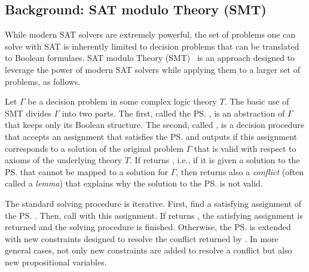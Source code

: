 

\subsection{Background: SAT modulo Theory (SMT)}
\label{sec:background-smt}

While modern SAT solvers are extremely powerful, the set of problems one can solve with SAT is inherently limited to decision problems that can be translated to Boolean formulaes. 
SAT modulo Theory (SMT)~\cite{DBLP:journals/jacm/NieuwenhuisOT06,DBLP:journals/constraints/BofillPSV12,DBLP:conf/cp/Nieuwenhuis10} is an approach designed to leverage the power of modern SAT solvers while applying them to a larger set of problems, as follows. 


Let $\Gamma$ be a decision problem in some complex logic theory $T$. 
The basic use of SMT divides $\Gamma$ into two parts. The first, called the \ps, is an abstraction of $\Gamma$ that keeps only its Boolean structure. The second, called \decidet, is a decision procedure that accepts an assignment that satisfies the \ps and outputs \true if this assignment 
corresponds to a solution of the original problem $\Gamma$ that is valid with respect to axioms of the underlying theory $T$. 
If \decidet returns \false, i.e., if it is given a solution to the \ps that cannot be mapped to a solution for $\Gamma$, then \decidet returns also a \emph{conflict}  (often called a {\em lemma}) that explains why the solution to the \ps is not valid. 


The standard \smt solving procedure is iterative. First, find a satisfying assignment of the \ps. 
Then, call \decidet with this assignment. If \decidet returns \true, the satisfying assignment is returned and the \smt solving procedure is finished. 
Otherwise, the \ps is extended with new constraints designed to resolve the conflict returned by \decidet. 
In more general cases, not only new constraints are added to resolve a conflict but also new propositional variables.

